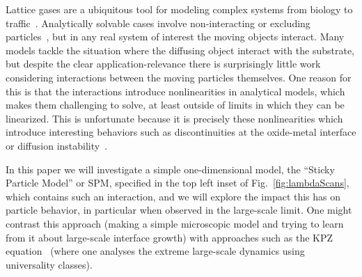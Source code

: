\documentclass[
reprint,
 amsmath,amssymb,
 aps,
 prl,
]{revtex4-1}
\begin{document}
Lattice gases are a ubiquitous tool for modeling complex systems from biology to traffic~\cite{1742-5468-2011-07-P07007, Mobilia2007, tegner2015high, zhu2012atomic, DealGrove1965, MottCabrera1949, Buzzaccaro2007}. 
Analytically solvable cases involve non-interacting or excluding particles~\cite{ladd1988application, liggett1985interacting, BenNaim1999, Shandarin1989, Frachebourg1999, Frachebourg2000}, but in any real system of interest the moving objects interact. Many models tackle the situation where the diffusing
object interact with the substrate,
but despite the clear application-relevance there is surprisingly little work considering interactions between the moving particles themselves.  One reason for this is that the interactions introduce nonlinearities in analytical models, which makes them
challenging to solve, at least outside of limits in which they can be linearized. This is unfortunate because it is precisely these nonlinearities which introduce interesting behaviors such as discontinuities at the oxide-metal interface or
diffusion instability~\cite{Obukhovsky2017, Gorokhova2010}.

In this paper we will
investigate a simple one-dimensional model, the ``Sticky Particle Model'' or SPM, specified in the top left inset of Fig.~\ref{fig:lambdaScans}, which contains such an interaction, and we will explore the impact this has on particle behavior, in particular
when observed in the large-scale limit.
One might contrast
this approach (making a simple microscopic model and trying to learn from it about large-scale interface growth) with approaches such as the KPZ equation~\cite{PhysRevLett.56.889, PhysRevA.38.4271, Sasamoto2010} (where one analyses the extreme
large-scale dynamics using universality classes).

\iffalse
\begin{figure}
\vspace{1em}
\caption{\label{fig:rates} White circles indicate particles, dark circles indicate empty sites (vacancies). Particles randomly move into adjacent vacancies with rate $1$ (having rescaled time for notational convenience), unless there is a
particle behind the position they're moving from, in which case they move with rate $\lambda$; the state of the site next to the position the particle is moving into is irrelevant.
Particles also move to the left, with rates such that the whole model is totally symmetric.}
    \texttt{[image: newRates]}
    \vspace{-3em}
\end{figure}
\fi
\end{document}
